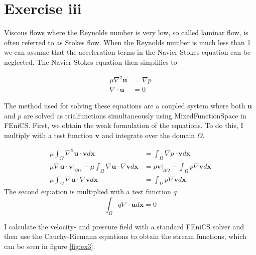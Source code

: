 \documentclass[11pt]{report}
\begin{document}
\chapter*{Exercise iii}

Viscous flows where the Reynolds number is very low, so called laminar flow, is often referred to as Stokes flow. When the Reynolds number is much less than 1 we can assume that the acceleration terms in the Navier-Stokes equation can be neglected. The Navier-Stokes equation then simplifies to

\begin{equation}
\begin{split}
\mu \nabla ^2 \mathbf{u} &= \nabla p \\
\nabla \cdot \mathbf{u} &= 0
\end{split}
\end{equation}

The method used for solving these equations are a coupled system where both $\mathbf{u}$ and $p$ are solved as trialfunctions simultaneously using MixedFunctionSpace in FEniCS. First, we obtain the weak formulation of the equations. To do this, I multiply with a test function $\mathbf{v}$ and integrate over the domain $\Omega$.

\begin{equation}
\begin{split}
\mu \int _\Omega \nabla ^2 \mathbf{u} \cdot \mathbf{v} d\mathbf{x} & = \int _\Omega \nabla p \cdot \mathbf{v} d\mathbf{x} \\
\mu \nabla \mathbf{u}\cdot \mathbf{v} \Big |_{\partial \Omega} - \mu \int _\Omega \nabla \mathbf{u}\cdot \nabla \mathbf{v} d\mathbf{x} &= p\mathbf{v} \Big |_{\partial \Omega} - \int _\Omega p\nabla \mathbf{v}d\mathbf{x} \\
\mu \int _\Omega \nabla \mathbf{u}\cdot \nabla \mathbf{v} d\mathbf{x} &= \int _\Omega p\nabla \mathbf{v}d\mathbf{x}
\end{split}
\end{equation}
The second equation is multiplied with a test function $q$
\begin{equation}
\int _\Omega q\nabla \cdot \mathbf{u} d\mathbf{x} = 0
\end{equation}

I calculate the velocity- and pressure field with a standard FEniCS solver and then use the Cauchy-Riemann equations to obtain the stream functions, which can be seen in figure \ref{fig:ex3}.
\end{document}
